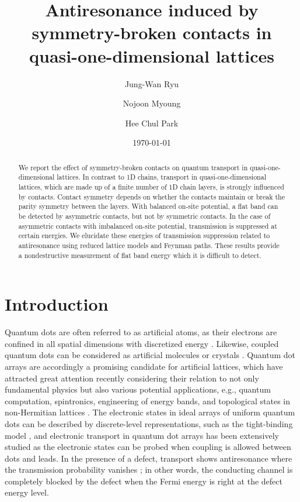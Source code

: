 \documentclass[twocolumn,showpacs,epsfig,pre]{revtex4}
\begin{document}
\draft
\title{Antiresonance induced by symmetry-broken contacts in quasi-one-dimensional lattices}
\author{Jung-Wan Ryu}
\author{Nojoon Myoung}
\author{Hee Chul Park}
\date{\today}

\begin{abstract}

We report the effect of symmetry-broken contacts on quantum transport in quasi-one-dimensional lattices. In contrast to 1D chains, transport in quasi-one-dimensional lattices, which are made up of a finite number of 1D chain layers, is strongly influenced by contacts. Contact symmetry depends on whether the contacts maintain or break the parity symmetry between the layers. With balanced on-site potential, a flat band can be detected by asymmetric contacts, but not by symmetric contacts. In the case of asymmetric contacts with imbalanced on-site potential, transmission is suppressed at certain energies. We elucidate these energies of transmission suppression related to antiresonance using reduced lattice models and Feynman paths. These results provide a nondestructive measurement of flat band energy which it is difficult to detect.
\end{abstract}
\maketitle
\narrowtext

\section{Introduction}

Quantum dots are often referred to as artificial atoms, as their electrons are confined in all spatial dimensions with discretized energy \cite{Kas93, Ash96}. Likewise, coupled quantum dots can be considered as artificial molecules or crystals \cite{Hol01, Hol02, Sha01}. Quantum dot arrays are accordingly a promising candidate for artificial lattices, which have attracted great attention recently considering their relation to not only fundamental physics but also various potential applications, e.g., quantum computation, spintronics, engineering of energy bands, and topological states in non-Hermitian lattices \cite{Bra13, Hen17, Nak17, Zhe15, Bab16, Cer16, Esa11, Lee16}. The electronic states in ideal arrays of uniform quantum dots can be described by discrete-level representations, such as the tight-binding model \cite{Dat97, Ryn16}, and electronic transport in quantum dot arrays has been extensively studied as the electronic states can be probed when coupling is allowed between dots and leads. In the presence of a defect, transport shows antiresonance where the transmission probability vanishes \cite{Wan02, Ore03, Ore03b, Bao05}; in other words, the conducting channel is completely blocked by the defect when the Fermi energy is right at the defect energy level.
\end{document}
